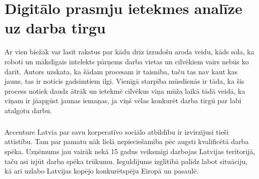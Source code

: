 \chapter{Digitālo prasmju ietekmes analīze uz darba tirgu}
Ar vien biežāk var lasīt rakstus par kādu drīz izzudošu aroda veidu, kāds sola, ka roboti un 
mākslīgais intelekts pārņems darba vietas un cilvēkiem vairs nebūs ko darīt. Autors uzskata, 
ka šādam procesam ir taisnība, taču tas nav kaut kas jauns, tas ir noticis gadsimtiem ilgi.
Vienīgā starpība mūsdienās ir tāda, ka šis process notiek daudz ātrāk un ietekmē cilvēkus viņa
mūža laikā tādā veidā, ka viņam ir jāapgūst jaunas iemaņas, ja viņš vēlas konkurēt darba tirgū
par labi atalgotu darbu.
\paragraph{}
Accenture Latvia par savu korperatīvo sociālo atbildību ir izvirzījusi tieši attīstību. Tam par pamatu nāk lielā nepieciešamība
pēc augsti kvalificētā darba spēka. Uzņēmums jau vairāk nekā 15 gadus veiksmīgi darbojas Latvijas teritorijā, taču asi izjūt
darba spēka trūkumu. Ieguldījums izglītībā palīdz labot situāciju, kā arī uzlabo Latvijas kopējo konkurētspēju Eiropā un pasaulē.

    
    
    
    
    

    
    

    
    


